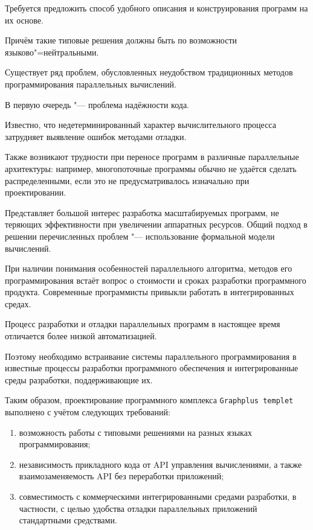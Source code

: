 Требуется предложить способ удобного описания и конструирования программ на их основе. 

Причём такие типовые решения должны быть по возможности языково"=нейтральными.



Существует ряд проблем, обусловленных неудобством традиционных методов программирования параллельных вычислений. 

В первую очередь "--- проблема надёжности кода. 

Известно, что недетерминированный характер вычислительного процесса затрудняет выявление ошибок методами отладки. 

Также возникают трудности при переносе программ в различные параллельные архитектуры: например, многопоточные программы обычно не удаётся сделать распределенными, если это не предусматривалось изначально при проектировании. 

Представляет большой интерес разработка масштабируемых программ, не теряющих эффективности при увеличении аппаратных ресурсов. Общий подход в решении перечисленных проблем "--- использование формальной модели вычислений.



При наличии понимания особенностей параллельного алгоритма, методов его программирования встаёт вопрос о стоимости и сроках разработки программного продукта. Современные программисты привыкли работать в интегрированных средах. 

Процесс разработки и отладки параллельных программ в настоящее время отличается более низкой автоматизацией. 

Поэтому необходимо встраивание системы параллельного программирования в известные процессы разработки программного обеспечения и интегрированные среды разработки, поддерживающие их.

Таким образом, проектирование программного комплекса {\tt Graphplus templet} выполнено с учётом следующих требований: 

\begin{enumerate}

\item возможность работы с типовыми решениями на разных языках программирования; 

\item независимость прикладного кода от API управления вычислениями, а также взаимозаменяемость API без переработки приложений; \item совместимость с коммерческими интегрированными средами разработки, в частности, с целью удобства отладки параллельных приложений стандартными средствами.

\end{enumerate}





